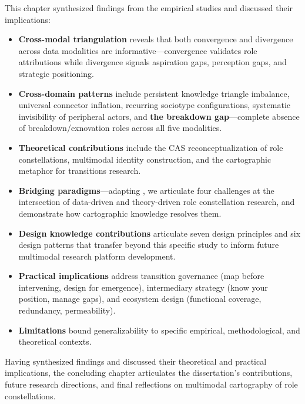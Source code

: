 \documentclass[../main.tex]{subfiles}
\begin{document}
\begin{summarybox}
This chapter synthesized findings from the empirical studies and discussed their implications:

\begin{itemize}[leftmargin=*, itemsep=0.3em]
\item \textbf{Cross-modal triangulation} reveals that both convergence and divergence across data modalities are informative---convergence validates role attributions while divergence signals aspiration gaps, perception gaps, and strategic positioning.

\item \textbf{Cross-domain patterns} include persistent knowledge triangle imbalance, universal connector inflation, recurring sociotype configurations, systematic invisibility of peripheral actors, and \textbf{the breakdown gap}---complete absence of breakdown/exnovation roles across all five modalities.

\item \textbf{Theoretical contributions} include the CAS reconceptualization of role constellations, multimodal identity construction, and the cartographic metaphor for transitions research.

\item \textbf{Bridging paradigms}---adapting \textcite{maass2018data}, we articulate four challenges at the intersection of data-driven and theory-driven role constellation research, and demonstrate how cartographic knowledge resolves them.

\item \textbf{Design knowledge contributions} articulate seven design principles and six design patterns that transfer beyond this specific study to inform future multimodal research platform development.

\item \textbf{Practical implications} address transition governance (map before intervening, design for emergence), intermediary strategy (know your position, manage gaps), and ecosystem design (functional coverage, redundancy, permeability).

\item \textbf{Limitations} bound generalizability to specific empirical, methodological, and theoretical contexts.
\end{itemize}
\end{summarybox}

\vspace{1em}
Having synthesized findings and discussed their theoretical and practical implications, the concluding chapter articulates the dissertation's contributions, future research directions, and final reflections on multimodal cartography of role constellations.
\end{document}
